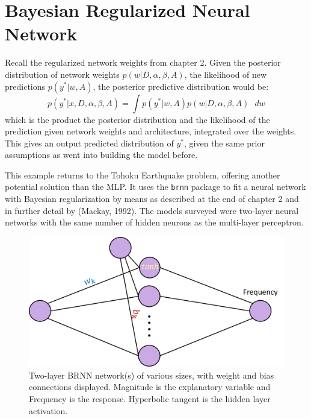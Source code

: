\section{Bayesian Regularized Neural Network}

Recall the regularized network weights from chapter 2. Given the posterior distribution of network weights $p(w|D,\alpha,\beta,A)$, the likelihood of new predictions $p(y^*|w,A)$, the posterior predictive distribution would be:
$$
p(y^*|x,D,\alpha,\beta,A) = \int p(y^*|w,A) p(w|D,\alpha,\beta,A) \text{ } dw
$$
which is the product the posterior distribution and the likelihood of the prediction given network weights and architecture, integrated over the weights.  This gives an output predicted distribution of $y^*$, given the same prior assumptions as went into building the model before.

This example returns to the Tohoku Earthquake problem, offering another potential solution than the MLP.  It uses the \texttt{brnn} package \cite{brnn} to fit a neural network with Bayesian regularization by means as described at the end of chapter 2 and in further detail by (Mackay, 1992).
The models surveyed were two-layer neural networks with the same number of hidden neurons as the multi-layer perceptron.

\begin{figure}[H]
    \center
    \includegraphics[width=0.55\linewidth]{Figures/BRNNdiag.png}
    \caption{\footnotesize{Two-layer BRNN network(s) of various sizes, with weight and bias connections displayed.  Magnitude is the explanatory variable and Frequency is the response.  Hyperbolic tangent is the hidden layer activation.}}
    \label{BRNNdiag}
\end{figure}

